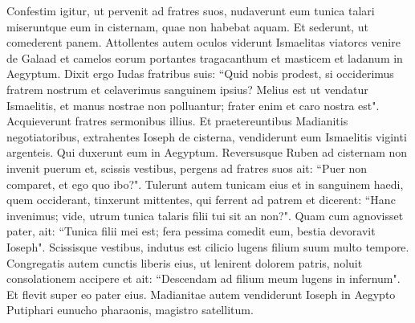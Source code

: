 \begin{biblechapter}
\verse Confestim igitur, ut pervenit ad fratres suos, nudaverunt eum tunica talari 
\verse miseruntque eum in cisternam, quae non habebat aquam. 
\verse Et sederunt, ut comederent panem. Attollentes autem oculos viderunt Ismaelitas viatorcs venire de Galaad et camelos eorum portantes tragacanthum et masticem et ladanum in Aegyptum. 
\verse Dixit ergo Iudas fratribus suis: “Quid nobis prodest, si occiderimus fratrem nostrum et celaverimus sanguinem ipsius? 
\verse Melius est ut vendatur Ismaelitis, et manus nostrae non polluantur; frater enim et caro nostra est". Acquieverunt fratres sermonibus illius. 
\verse Et praetereuntibus Madianitis negotiatoribus, extrahentes Ioseph de cisterna, vendiderunt eum Ismaelitis viginti argenteis. Qui duxerunt eum in Aegyptum. 
\verse Reversusque Ruben ad cisternam non invenit puerum 
\verse et, scissis vestibus, pergens ad fratres suos ait: “Puer non comparet, et ego quo ibo?".  
\verse Tulerunt autem tunicam eius et in sanguinem haedi, quem occiderant, tinxerunt  
\verse mittentes, qui ferrent ad patrem et dicerent: “Hanc invenimus; vide, utrum tunica talaris filii tui sit an non?". 
\verse Quam cum agnovisset pater, ait: “Tunica filii mei est; fera pessima comedit eum, bestia devoravit Ioseph". 
\verse Scissisque vestibus, indutus est cilicio lugens filium suum multo tempore. 
\verse Congregatis autem cunctis liberis eius, ut lenirent dolorem patris, noluit consolationem accipere et ait: “Descendam ad filium meum lugens in infernum". Et flevit super eo pater eius. 
\verse Madianitae autem vendiderunt Ioseph in Aegypto Putiphari eunucho pharaonis, magistro satellitum. 
\end{biblechapter}

